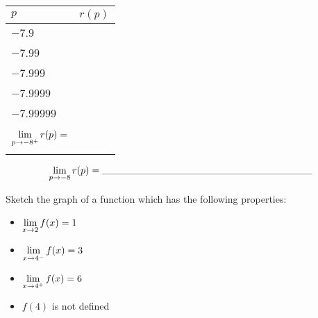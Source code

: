 \documentclass[notes]{subfiles}
\begin{document}
\begin{ex}
\begin{center}
\begin{minipage}{.45\textwidth}
					\tabulinesep=1mm
					\begin{tabu}{|X[c]|X[1.5,c]|}\hline
						\(p\) 		& \(r(p)\) \\ \hline
								& \\
						\(-7.9\)		& \\ 
								& \\ \hline
								& \\
						\(-7.99\)	& \\
								& \\ \hline 
								& \\
						\(-7.999\)	& \\ 
								& \\ \hline
								& \\ 
						\(-7.9999\)	& \\ 
								& \\ \hline
								& \\
						\(-7.99999\)	&\\
								&\\ \hline\hline
								&\\
						\(\displaystyle \lim_{p\to -8^+}r(p) =\) & \\
								&\\ \hline
					\end{tabu}
				\end{minipage}
				\[\lim_{p\to -8}r(p)= \blank{3}\]
			\end{center}					
		\end{ex}
			\newpage
			
		\begin{ex}
			Sketch the graph of a function which has the following properties:
			\begin{itemize}
				\item \(\displaystyle \lim_{x\to 2} f(x) =1 \)
				\item \(\displaystyle \lim_{x\to 4^-} f(x) = 3\)
				\item \(\displaystyle \lim_{x\to 4^+} f(x) = 6 \)
				\item \(f(4)\) is not defined
			\end{itemize}
		\end{ex}
			
\end{document}
